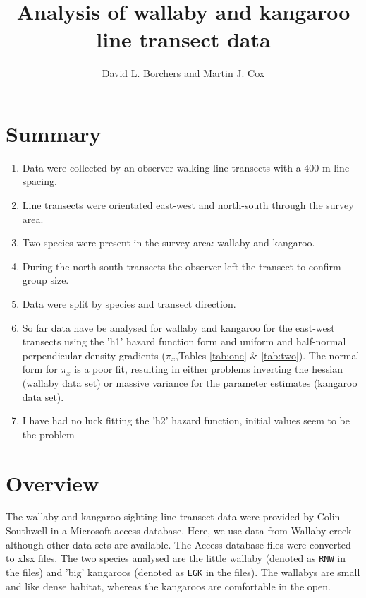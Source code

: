\documentclass{article}
\begin{document}


\title{Analysis of wallaby and kangaroo line transect data}
\author{David L. Borchers and Martin J. Cox}
\maketitle
\section{Summary}
\begin{enumerate}
  \item Data were collected by an observer walking line transects with a 400 m line spacing.
  \item Line transects were orientated east-west and north-south through the survey area.
  \item Two species were present in the survey area: wallaby and kangaroo.
  \item During the north-south transects the observer left the transect to confirm group size.
  \item Data were split by species and transect direction.
  \item So far data have be analysed for wallaby and kangaroo for the east-west transects using the 'h1' hazard function form and uniform and half-normal perpendicular density gradients ($\pi_x$,Tables \ref{tab:one} \& \ref{tab:two}).  The normal form for $\pi_x$ is a poor fit, resulting in either problems inverting the hessian (wallaby data set) or massive variance for the parameter estimates (kangaroo data set). 
  \item I have had no luck fitting the 'h2' hazard function, initial values seem to be the problem
\end{enumerate}

\section{Overview}
The wallaby and kangaroo sighting line transect data were provided by Colin Southwell in a Microsoft access database.  Here, we use data from Wallaby creek although other data sets are available. The Access database files were converted to xlsx files.  The two species analysed are the little wallaby (denoted as \texttt{RNW} in the files) and 'big' kangaroos (denoted as \texttt{EGK} in the files).  The wallabys are small and like dense habitat, whereas the kangaroos are comfortable in the open.  
\end{document}
